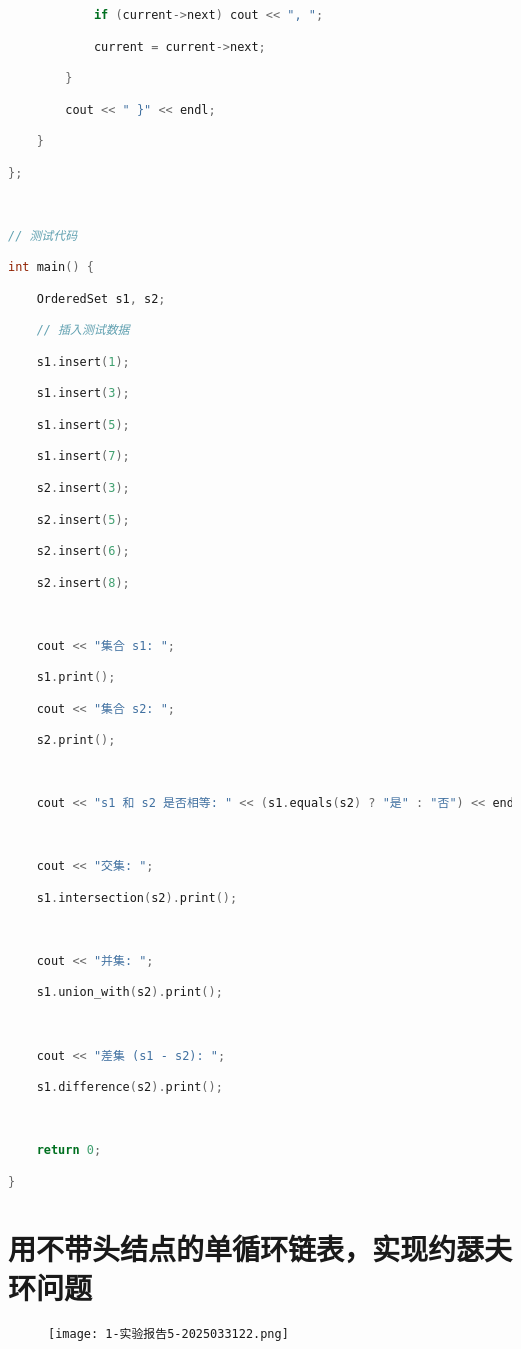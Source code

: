 \begin{lstlisting}[language=C++]
            if (current->next) cout << ", ";

            current = current->next;

        }

        cout << " }" << endl;

    }

};

  

// 测试代码

int main() {

    OrderedSet s1, s2;

    // 插入测试数据

    s1.insert(1);

    s1.insert(3);

    s1.insert(5);

    s1.insert(7);

    s2.insert(3);

    s2.insert(5);

    s2.insert(6);

    s2.insert(8);

  

    cout << "集合 s1: ";

    s1.print();

    cout << "集合 s2: ";

    s2.print();

  

    cout << "s1 和 s2 是否相等: " << (s1.equals(s2) ? "是" : "否") << endl;

  

    cout << "交集: ";

    s1.intersection(s2).print();

  

    cout << "并集: ";

    s1.union_with(s2).print();

  

    cout << "差集 (s1 - s2): ";

    s1.difference(s2).print();

  

    return 0;

}
\end{lstlisting}
\section{用不带头结点的单循环链表，实现约瑟夫环问题}

\begin{figure}[H]
\centering
\texttt{[image: 1-实验报告5-2025033122.png]}
\label{}
\end{figure}

